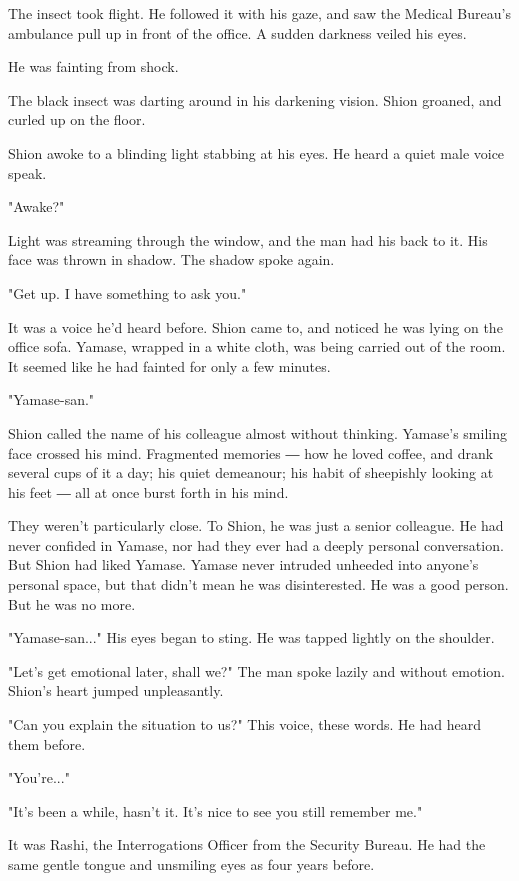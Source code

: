 The insect took flight. He followed it with his gaze, and saw the
Medical Bureau's ambulance pull up in front of the office. A sudden
darkness veiled his eyes.

He was fainting from shock.

The black insect was darting around in his darkening vision. Shion
groaned, and curled up on the floor.

Shion awoke to a blinding light stabbing at his eyes. He heard a quiet
male voice speak.

"Awake?"

Light was streaming through the window, and the man had his back to it.
His face was thrown in shadow. The shadow spoke again.

"Get up. I have something to ask you."

It was a voice he'd heard before. Shion came to, and noticed he was
lying on the office sofa. Yamase, wrapped in a white cloth, was being
carried out of the room. It seemed like he had fainted for only a few
minutes.

"Yamase-san."

Shion called the name of his colleague almost without thinking. Yamase's
smiling face crossed his mind. Fragmented memories ― how he loved
coffee, and drank several cups of it a day; his quiet demeanour; his
habit of sheepishly looking at his feet ― all at once burst forth in his
mind.

They weren't particularly close. To Shion, he was just a senior
colleague. He had never confided in Yamase, nor had they ever had a
deeply personal conversation. But Shion had liked Yamase. Yamase never
intruded unheeded into anyone's personal space, but that didn't mean he
was disinterested. He was a good person. But he was no more.

"Yamase-san..." His eyes began to sting. He was tapped lightly on the
shoulder.

"Let's get emotional later, shall we?" The man spoke lazily and without
emotion. Shion's heart jumped unpleasantly.

"Can you explain the situation to us?" This voice, these words. He had
heard them before.

"You're..."

"It's been a while, hasn't it. It's nice to see you still remember me."

It was Rashi, the Interrogations Officer from the Security Bureau. He
had the same gentle tongue and unsmiling eyes as four years before.


